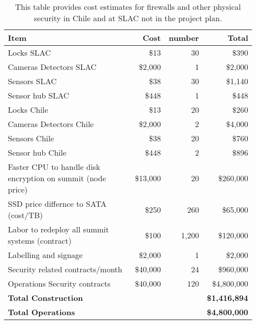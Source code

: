 \tiny \begin{longtable} {|p{}|r|r|r|} \caption{This table provides cost estimates for firewalls and other physical security in Chile and at SLAC not in the project plan. \label{tab:firewalls}}\\ 
\hline 
\textbf{Item}&\textbf{Cost}&\textbf{number}&\textbf{Total} \\ \hline
{Locks SLAC}&{\$13}&{30}&{\$390} \\ \hline
{Cameras Detectors  SLAC}&{\$2,000}&{1}&{\$2,000} \\ \hline
{Sensors SLAC}&{\$38}&{30}&{\$1,140} \\ \hline
{Sensor hub SLAC}&{\$448}&{1}&{\$448} \\ \hline
{Locks Chile}&{\$13}&{20}&{\$260} \\ \hline
{Cameras Detectors Chile}&{\$2,000}&{2}&{\$4,000} \\ \hline
{Sensors Chile}&{\$38}&{20}&{\$760} \\ \hline
{Sensor hub Chile}&{\$448}&{2}&{\$896} \\ \hline
{Faster CPU to handle disk encryption on summit (node price)}&{\$13,000}&{20}&{\$260,000} \\ \hline
{SSD price differnce to SATA (cost/TB)}&{\$250}&{260}&{\$65,000} \\ \hline
{Labor to redeploy all summit systems (contract)}&{\$100}&{1,200}&{\$120,000} \\ \hline
{Labelling and signage }&{\$2,000}&{1}&{\$2,000} \\ \hline
{Security related contracts/month}&{\$40,000}&{24}&{\$960,000} \\ \hline
{Operations Security contracts}&{\$40,000}&{120}&{\$4,800,000} \\ \hline
\textbf{Total Construction}&\textbf{}&\textbf{}&\textbf{\$1,416,894} \\ \hline
\textbf{Total Operations}&\textbf{}&\textbf{}&\textbf{\$4,800,000} \\ \hline
\end{longtable} \normalsize
